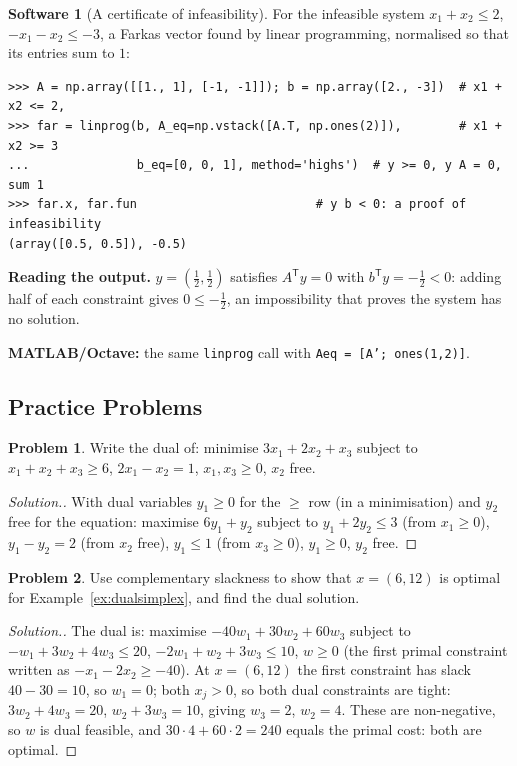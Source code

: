 \documentclass[11pt,a4paper]{article}
\numberwithin{equation}{section}
\theoremstyle{definition}
\newtheorem{software}[thm]{Software}
\newtheorem{problemx}{Problem}[subsection]
\newenvironment{problem}{\begin{problemx}}{\end{problemx}}
\newenvironment{solution}
  {\renewcommand{\qedsymbol}{}\begin{proof}[\textit{Solution}.]}
  {\end{proof}}
\begin{document}
\begin{software}[A certificate of infeasibility]
\label{sw:farkas}
For the infeasible system $x_1 + x_2 \leq 2$, $-x_1 - x_2 \leq -3$, a Farkas vector found by linear programming, normalised so that its entries sum to $1$:
{\small\begin{verbatim}
>>> A = np.array([[1., 1], [-1, -1]]); b = np.array([2., -3])  # x1 + x2 <= 2,
>>> far = linprog(b, A_eq=np.vstack([A.T, np.ones(2)]),        # x1 + x2 >= 3
...               b_eq=[0, 0, 1], method='highs')  # y >= 0, y A = 0, sum 1
>>> far.x, far.fun                         # y b < 0: a proof of infeasibility
(array([0.5, 0.5]), -0.5)
\end{verbatim}}
\textbf{Reading the output.} $y = (\frac12, \frac12)$ satisfies $A^{\mathsf T}y = 0$ with $b^{\mathsf T}y = -\frac12 < 0$: adding half of each constraint gives $0 \leq -\frac12$, an impossibility that proves the system has no solution.

\textbf{MATLAB/Octave:} the same \texttt{linprog} call with \texttt{Aeq = [A'; ones(1,2)]}.
\end{software}

\subsection{Practice Problems}

\begin{problem}
Write the dual of: minimise $3x_1 + 2x_2 + x_3$ subject to $x_1 + x_2 + x_3 \geq 6$, $2x_1 - x_2 = 1$, $x_1, x_3 \geq 0$, $x_2$ free.
\end{problem}

\begin{solution}
With dual variables $y_1 \geq 0$ for the $\geq$ row (in a minimisation) and $y_2$ free for the equation: maximise $6y_1 + y_2$ subject to $y_1 + 2y_2 \leq 3$ (from $x_1 \geq 0$), $y_1 - y_2 = 2$ (from $x_2$ free), $y_1 \leq 1$ (from $x_3 \geq 0$), $y_1 \geq 0$, $y_2$ free.
\end{solution}

\begin{problem}
Use complementary slackness to show that $x = (6, 12)$ is optimal for Example~\ref{ex:dualsimplex}, and find the dual solution.
\end{problem}

\begin{solution}
The dual is: maximise $-40w_1 + 30w_2 + 60w_3$ subject to $-w_1 + 3w_2 + 4w_3 \leq 20$, $-2w_1 + w_2 + 3w_3 \leq 10$, $w \geq 0$ (the first primal constraint written as $-x_1 - 2x_2 \geq -40$). At $x = (6, 12)$ the first constraint has slack $40 - 30 = 10$, so $w_1 = 0$; both $x_j > 0$, so both dual
constraints are tight: $3w_2 + 4w_3 = 20$, $w_2 + 3w_3 = 10$, giving $w_3 = 2$, $w_2 = 4$. These are non-negative, so $w$ is dual feasible, and $30\cdot 4 + 60\cdot 2 = 240$ equals the primal cost: both are optimal.
\end{solution}
\end{document}
